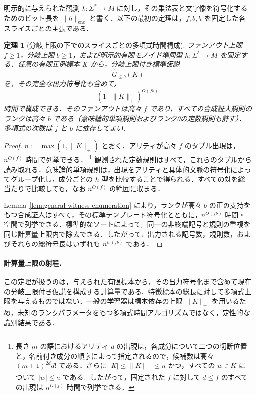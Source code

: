 \documentclass[11pt,a4paper]{ltjsarticle}
\numberwithin{equation}{section}
\theoremstyle{plain}
\newtheorem{theorem}{定理}[section]
\theoremstyle{definition}
\theoremstyle{remark}
\begin{document}
明示的に与えられた観測 \(h:\Sigma^*\to M\) に対し，その乗法表と文字像を符号化するためのビット長を
\(\|h\|_{\mathrm{enc}}\) と書く．以下の最初の定理は，\(f,b,h\) を固定した各スライスごとの主張である．

\begin{theorem}[分岐上限の下でのスライスごとの多項式時間構成]
\label{thm:poly}
ファンアウト上限 \(f\ge1\)，分岐上限 \(b\ge1\)，および明示的有限モノイド準同型
\(h:\Sigma^*\to M\) を固定する．任意の有限正例標本 \(K\) から，分岐上限付き標準仮説
\[
  \widehat G_{\le b}(K)
\]
を，その完全な出力符号化も含めて，
\[
  (1+\|K\|_+)^{O(fb)}
\]
時間で構成できる．そのファンアウトは高々 \(f\) であり，すべての合成証人規則のランクは高々 \(b\) である（意味論的単項規則およびランク0の定数規則も許す）．多項式の次数は \(f\) と \(b\) に依存してよい．
\end{theorem}

\begin{proof}
\(n:=\max(1,\|K\|_+)\) とおく．アリティが高々 \(f\) のタプル出現は，\(n^{O(f)}\) 時間で列挙できる．%
\footnote{長さ \(m\) の語におけるアリティ \(d\) の出現は，各成分について二つの切断位置と，名前付き成分の順序によって指定されるので，候補数は高々
\((m+1)^{2d}d!\) である．さらに \(|K|\le\|K\|_+\le n\) かつ，すべての \(w\in K\) について \(|w|\le n\) である．したがって，固定された \(f\) に対して \(d\le f\) のすべての出現は \(n^{O(f)}\) 時間で列挙できる．}
観測された定数規則はすべて，これらのタプルから読み取れる．意味論的単項規則は，出現をアリティと具体的文脈の符号化によってグループ化し，成分ごとの \(h\) 型を比較することで得られる．すべての対を総当たりで比較しても，なお \(n^{O(f)}\) の範囲に収まる．

Lemma~\ref{lem:general-witness-enumeration} により，ランクが高々 \(b\) の正の支持をもつ合成証人はすべて，その標準テンプレート符号化とともに，\(n^{O(fb)}\) 時間・空間で列挙できる．標準的なソートによって，同一の非終端記号と規則の重複を同じ計算量上限内で除去できる．したがって，出力される記号数，規則数，およびそれらの総符号長はいずれも \(n^{O(fb)}\) である．
\end{proof}

\paragraph{計算量上限の射程．}
この定理が扱うのは，与えられた有限標本から，その出力符号化まで含めて現在の分岐上限付き仮説を構成する計算量である．特徴標本の総長に対して多項式上限を与えるものではない．一般の学習器は標本依存の上限 \(\|K\|_+\) を用いるため，未知のランクパラメータをもつ多項式時間アルゴリズムではなく，定性的な識別結果である．
\end{document}
